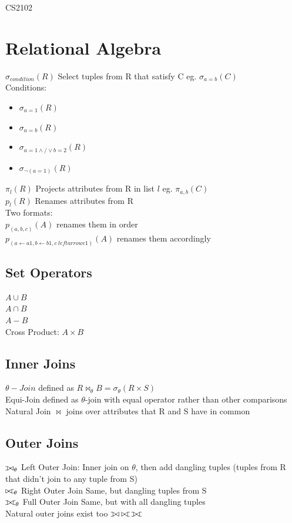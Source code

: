 \documentclass{article}
\def\ojoin{\setbox0=\hbox{$\bowtie$}%
  \rule[-.02ex]{.25em}{.4pt}\llap{\rule[\ht0]{.25em}{.4pt}}}
\def\leftouterjoin{\mathbin{\ojoin\mkern-5.8mu\bowtie}}
\def\rightouterjoin{\mathbin{\bowtie\mkern-5.8mu\ojoin}}
\def\fullouterjoin{\mathbin{\ojoin\mkern-5.8mu\bowtie\mkern-5.8mu\ojoin}}
\begin{document}
\begin{multicols*}{2}
    \noindent
    {\LARGE CS2102}
    \section*{Relational Algebra}
    $\sigma_{condition}(R)$ Select tuples from R that satisfy C eg. $\sigma_{a=b}(C)$\\
    Conditions:
    \begin{itemize}
        \item $\sigma_{a=1}(R)$
        \item $\sigma_{a=b}(R)$
        \item $\sigma_{a=1 \wedge/\vee b=2}(R)$
        \item $\sigma_{\neg (a=1)}(R)$

    \end{itemize}
    $\pi_{l}(R)$ Projects attributes from R in list $l$ eg. $\pi_{a,b}(C)$\\
    $p_{l}(R)$ Renames attributes from R \\
    Two formats: \\
    $p_{(a,b,c)}(A)$ renames them in order \\
    $p_{(a \leftarrow a1,b \leftarrow b1,c\ leftarrow c1)}(A)$ renames them accordingly
    \subsection*{Set Operators}
    $A \cup B$\\ $A \cap B$\\ $A - B$ \\
    Cross Product: $A \times B$
    \subsection*{Inner Joins}
    $\theta-Join$ defined as $R \Join_\theta B = \sigma_{\theta}(R \times S)$\\
    Equi-Join defined as $\theta$-join with equal operator rather than other comparisons\\
    Natural Join $\Join$ joins over attributes that R and S have in common
    \subsection*{Outer Joins}
    $\leftouterjoin_\theta$ Left Outer Join: Inner join on $\theta$, then add dangling tuples (tuples from R that didn't join to any tuple from S)\\
    $\rightouterjoin_\theta$ Right Outer Join Same, but dangling tuples from S\\
    $\fullouterjoin_\theta$ Full Outer Join Same, but with all dangling tuples\\
    Natural outer joins exist too $\leftouterjoin \rightouterjoin \fullouterjoin$

\end{multicols*}
\end{document}
